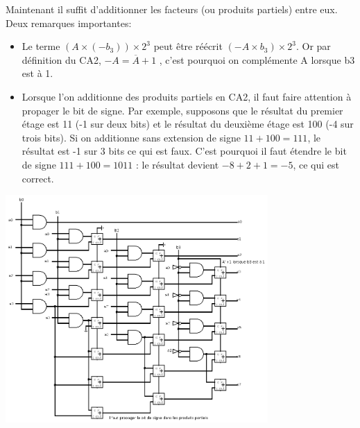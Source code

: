 \documentclass[a4paper,10pt]{exam}
\begin{document}
\begin{enumerate}
\begin{solution}
      Maintenant il suffit d'additionner les facteurs (ou produits partiels) entre eux.
      \\Deux remarques importantes:
      \begin{itemize}
        \item Le terme $(A \times (-b_3)) \times 2^3$ peut être réécrit $(-A \times b_3) \times 2^3$.
	  Or par définition du CA2, $-A = \overline{A} + 1$	, c'est pourquoi on complémente
	  A lorsque b3 est à 1.
	\item Lorsque l'on additionne des produits partiels en CA2, il faut faire
	  attention à propager le bit de signe. Par exemple, supposons que le résultat
	  du premier étage est 11 (-1 sur deux bits) et le résultat du deuxième étage
	  est 100 (-4 sur trois bits). Si on additionne sans extension de signe
	  $11 + 100 = 111$, le résultat est -1 sur 3 bits ce qui est faux.
	  C'est pourquoi il faut étendre le bit de signe $111 + 100 = 1011$ : le
	  résultat devient $-8 + 2 + 1 = -5$, ce qui est correct.
      \end{itemize}

      \includegraphics[width=10cm]{4-mult-CA-2}

    \end{solution}

\end{enumerate}
\end{document}
